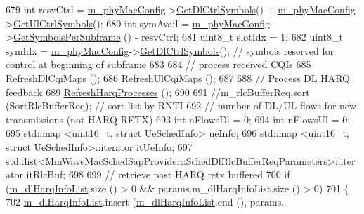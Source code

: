\begin{DoxyCode}
679         \textcolor{keywordtype}{int} resvCtrl = \hyperlink{classns3_1_1MmWaveMacScheduler_a24d7af4971d2e500fe543cefbafa2fd9}{m\_phyMacConfig}->\hyperlink{classns3_1_1MmWavePhyMacCommon_a1be2da684374de93d7f501aab2441b5a}{GetDlCtrlSymbols}() + 
      \hyperlink{classns3_1_1MmWaveMacScheduler_a24d7af4971d2e500fe543cefbafa2fd9}{m\_phyMacConfig}->\hyperlink{classns3_1_1MmWavePhyMacCommon_aa0bf8af14050bc5dc6513fbc86319a9b}{GetUlCtrlSymbols}();
680         \textcolor{keywordtype}{int} symAvail = \hyperlink{classns3_1_1MmWaveMacScheduler_a24d7af4971d2e500fe543cefbafa2fd9}{m\_phyMacConfig}->\hyperlink{classns3_1_1MmWavePhyMacCommon_a2fe835b76e3c689defa413e395cd10cb}{GetSymbolsPerSubframe} () - 
      resvCtrl;
681         uint8\_t slotIdx = 1;
682         uint8\_t symIdx = \hyperlink{classns3_1_1MmWaveMacScheduler_a24d7af4971d2e500fe543cefbafa2fd9}{m\_phyMacConfig}->\hyperlink{classns3_1_1MmWavePhyMacCommon_a1be2da684374de93d7f501aab2441b5a}{GetDlCtrlSymbols}(); \textcolor{comment}{// symbols
       reserved for control at beginning of subframe}
683 
684         \textcolor{comment}{// process received CQIs}
685         \hyperlink{classns3_1_1MmWaveFlexTtiMacScheduler_a258b38ccd67574a92e83ee7797850a99}{RefreshDlCqiMaps} ();
686         \hyperlink{classns3_1_1MmWaveFlexTtiMacScheduler_a37e57c25e03ec4c1865025f8e5301d32}{RefreshUlCqiMaps} ();
687 
688         \textcolor{comment}{// Process DL HARQ feedback}
689         \hyperlink{classns3_1_1MmWaveFlexTtiMacScheduler_a281920e70bec00820617efef009a83fd}{RefreshHarqProcesses} ();
690 
691         \textcolor{comment}{//m\_rlcBufferReq.sort (SortRlcBufferReq);       // sort list by RNTI}
692         \textcolor{comment}{// number of DL/UL flows for new transmissions (not HARQ RETX)}
693         \textcolor{keywordtype}{int} nFlowsDl = 0;
694         \textcolor{keywordtype}{int} nFlowsUl = 0;
695         std::map <uint16\_t, struct UeSchedInfo> ueInfo;
696         std::map <uint16\_t, struct UeSchedInfo>::iterator itUeInfo;
697         std::list<MmWaveMacSchedSapProvider::SchedDlRlcBufferReqParameters>::iterator itRlcBuf;
698 
699         \textcolor{comment}{// retrieve past HARQ retx buffered}
700         \textcolor{keywordflow}{if} (\hyperlink{classns3_1_1MmWaveFlexTtiMacScheduler_af30d399e8abceedfe762a84ea26336b6}{m\_dlHarqInfoList}.size () > 0 && params.m\_dlHarqInfoList.size () > 0)
701         \{
702                 \hyperlink{classns3_1_1MmWaveFlexTtiMacScheduler_af30d399e8abceedfe762a84ea26336b6}{m\_dlHarqInfoList}.insert (\hyperlink{classns3_1_1MmWaveFlexTtiMacScheduler_af30d399e8abceedfe762a84ea26336b6}{m\_dlHarqInfoList}.end (), params.

\end{DoxyCode}

